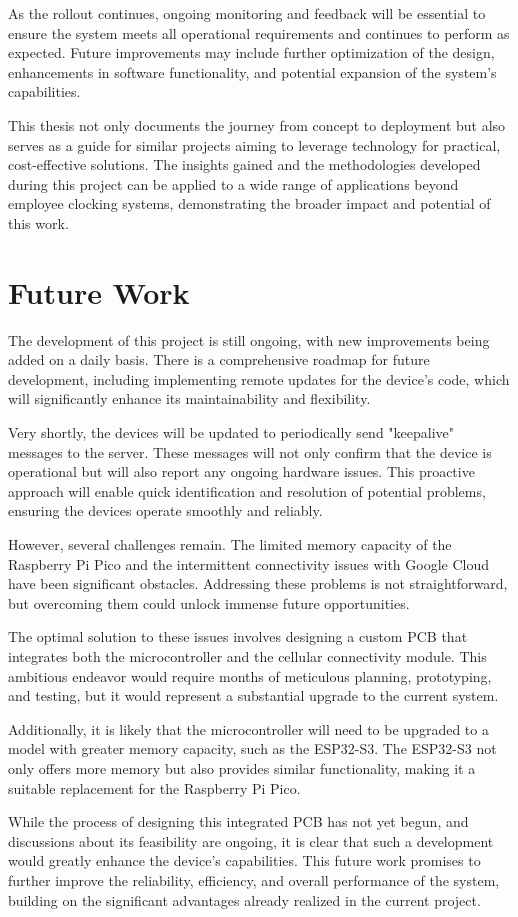 As the rollout continues, ongoing monitoring and feedback will be essential to ensure the system 
meets all operational requirements and continues to perform as expected. Future improvements may 
include further optimization of the design, enhancements in software functionality, and potential 
expansion of the system's capabilities.

This thesis not only documents the journey from concept to deployment but also serves as a guide 
for similar projects aiming to leverage technology for practical, cost-effective solutions. The 
insights gained and the methodologies developed during this project can be applied to a wide range 
of applications beyond employee clocking systems, demonstrating the broader impact and potential 
of this work.


\section{Future Work}

The development of this project is still ongoing, with new improvements being added on a daily 
basis. There is a comprehensive roadmap for future development, including implementing remote 
updates for the device's code, which will significantly enhance its maintainability and 
flexibility.

Very shortly, the devices will be updated to periodically send "keepalive" messages to the server. 
These messages will not only confirm that the device is operational but will also report any 
ongoing hardware issues. This proactive approach will enable quick identification and resolution 
of potential problems, ensuring the devices operate smoothly and reliably.

However, several challenges remain. The limited memory capacity of the Raspberry Pi Pico and the 
intermittent connectivity issues with Google Cloud have been significant obstacles. Addressing 
these problems is not straightforward, but overcoming them could unlock immense future 
opportunities.

The optimal solution to these issues involves designing a custom PCB that integrates both the 
microcontroller and the cellular connectivity module. This ambitious endeavor would require months 
of meticulous planning, prototyping, and testing, but it would represent a substantial upgrade to 
the current system.

Additionally, it is likely that the microcontroller will need to be upgraded to a model with 
greater memory capacity, such as the ESP32-S3. The ESP32-S3 not only offers more memory but also 
provides similar functionality, making it a suitable replacement for the Raspberry Pi Pico.

While the process of designing this integrated PCB has not yet begun, and discussions about its 
feasibility are ongoing, it is clear that such a development would greatly enhance the device's 
capabilities. This future work promises to further improve the reliability, efficiency, and 
overall performance of the system, building on the significant advantages already realized in the 
current project.
